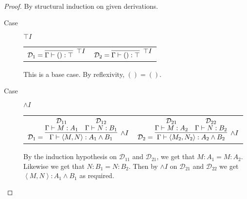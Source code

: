 \documentclass[11pt,letterpaper]{article}
\newcommand{\D}{\mathcal{D}}
\newcommand{\proves}{\vdash}
\newcommand{\andproofterm}[4]{
    \left \langle #1, #3 \right \rangle : #2 \land #4
}
\begin{document}
\begin{proof}
    By structural induction on given derivations.

    \begin{description}
        \item[Case] $\top I$

            \begin{center}
                \begin{tabular}{cc}
                    $\mathcal{D}_1
                        = \infer[\top I]{\Gamma \proves () : \top}{}$
                    &
                    $\mathcal{D}_2
                        = \infer[\top I]{\Gamma \proves () : \top}{}$
                \end{tabular}
            \end{center}

            This is a base case. By reflexivity, $() = ()$.

        \item[Case] $\land I$

            \begin{center}
                \begin{tabular}{cc}
                    $
                    \mathcal{D}_1 = \infer[\land I]{
                        \Gamma \proves \andproofterm{M}{A_1}{N}{B_1}
                    }{
                        \deduce[\mathcal{D}_{11}]{
                            \Gamma \proves M : A_1
                        }{}
                        &
                        \deduce[\mathcal{D}_{12}]{
                            \Gamma \proves N : B_1
                        }{}
                    }
                    $
                    &
                    $
                    \mathcal{D}_2 = \infer[\land I]{
                        \Gamma \proves \andproofterm{M_2}{A_2}{N_2}{B_2}
                    }{
                        \deduce[\mathcal{D}_{21}]{
                            \Gamma \proves M : A_2
                        }{}
                        &
                        \deduce[\mathcal{D}_{22}]{
                            \Gamma \proves N : B_2
                        }{}
                    }
                    $
                \end{tabular}
            \end{center}

            By the induction hypothesis on $\D_{11}$ and $\D_{21}$, we get that
            $M : A_1 = M : A_2$. Likewise we get that $N : B_1 = N : B_2$.
            Then by $\land I$ on $\D_{21}$ and $\D_{22}$ we get
            $\left \langle M, N \right \rangle : A_1 \land B_1$ as required.


\end{description}
\end{proof}
\end{document}
